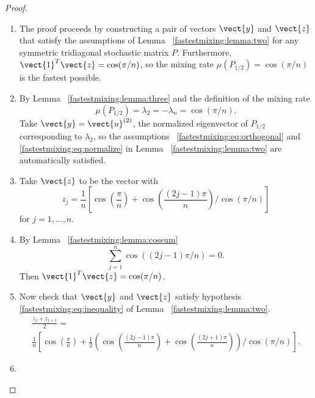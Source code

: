 \documentclass[12pt]{article}
\begin{document}
\begin{proof}
    \begin{enumerate}
        \item
            The proof proceeds by constructing a pair of vectors \(
            \vect{y} \) and \( \vect{z} \) that satisfy the assumptions
            of Lemma~%
            \ref{fastestmixing:lemma:two} for any symmetric tridiagonal
            stochastic matrix \( P \).  Furthermore, \( \vect{1}^T \vect
            {z} = \cos(\pi/n) \), so the mixing rate \( \mu(P_{1/2}) =
            \cos(\pi/n) \) is the fastest possible.
        \item
            By Lemma~%
            \ref{fastestmixing:lemma:three} and the definition of the
            mixing rate
            \[
                \mu(P_{1/2}) = \lambda_2 = -\lambda_n = \cos(\pi/n).
            \] Take \( \vect{y} = \vect{u}^{(2)} \), the normalized
            eigenvector of \( P_{1/2} \) corresponding to \( \lambda_2 \),
            so the assumptions~%
            \eqref{fastestmixing:eq:orthogonal} and~%
            \eqref{fastestmixing:eq:normalize} in Lemma~%
            \ref{fastestmixing:lemma:two} are automatically satisfied.
        \item
            Take \( \vect{z} \) to be the vector with
            \[
                z_j = \frac{1}{n} \left[ \cos\left(\frac{\pi}{n}\right)
                + \cos\left( \frac{(2j-1)\pi }{n } \right) \bigg/ \cos\left
                ( \pi/n \right) \right]
            \] for \( j = 1, \dots, n \).
        \item
            By Lemma~%
            \ref{fastestmixing:lemma:cossum}
            \[
                \sum_{j=1}^{n} \cos((2j-1)\pi/n) = 0.
            \] Then \( \vect{1}^T \vect{z} = \cos(\pi/n) \).
        \item
            Now check that \( \vect{y} \) and \( \vect{z} \) satisfy
            hypothesis~%
            \eqref{fastestmixing:eq:inequality} of Lemma~%
            \ref{fastestmixing:lemma:two}.
            \begin{multline*}
                \frac{z_j + z_{j+1}}{2} = \\
                \frac{1}{n} \left[ \cos\left(\frac {\pi} {n}\right) +
                \frac{1}{2} \left( \cos\left( \frac{(2j-1)\pi }{n }
                \right) + \cos\left( \frac{(2j+1)\pi }{n } \right)
                \right) \bigg/ \cos\left(\pi/n \right) \right].
            \end{multline*}
        \item

\end{enumerate}
\end{proof}
\end{document}
